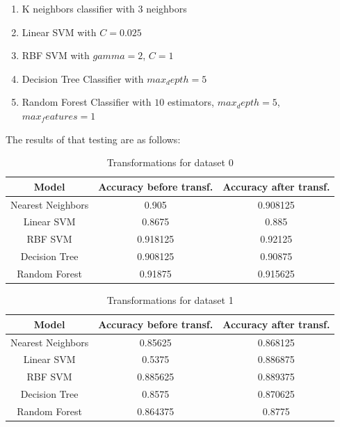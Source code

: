 \documentclass[conference]{IEEEtran}
\begin{document}
\begin{enumerate}
	\item K neighbors classifier with 3 neighbors
	\item Linear SVM with $C=0.025$
	\item RBF SVM with $gamma = 2$, $C = 1$
	\item Decision Tree Classifier with $max_depth = 5$
	\item Random Forest Classifier with $10$ estimators, $max_depth=5$, $max_features=1$
\end{enumerate}

The results of that testing are as follows:

\begin{table}[htbp]
	\caption{Transformations for dataset 0}
	\begin{center}
		\begin{tabular}{|c|c|c|}
			\hline
			\textbf{Model}&\textbf{Accuracy before transf.}&\textbf{Accuracy after transf.} \\
			\hline
			Nearest Neighbors&0.905&0.908125 \\
			\hline
			Linear SVM&0.8675&0.885 \\
			\hline
			RBF SVM&0.918125&0.92125 \\
			\hline
			Decision Tree&0.908125&0.90875 \\
			\hline
			Random Forest&0.91875&0.915625 \\
			\hline
		\end{tabular}
		\label{tab3}
	\end{center}
\end{table}

\begin{table}[htbp]
	\caption{Transformations for dataset 1}
	\begin{center}
		\begin{tabular}{|c|c|c|}
			\hline
			\textbf{Model}&\textbf{Accuracy before transf.}&\textbf{Accuracy after transf.} \\
			\hline
			Nearest Neighbors&0.85625&0.868125 \\
			\hline
			Linear SVM&0.5375&0.886875 \\
			\hline
			RBF SVM&0.885625&0.889375 \\
			\hline
			Decision Tree&0.8575&0.870625 \\
			\hline
			Random Forest&0.864375&0.8775 \\
			\hline
		\end{tabular}
		\label{tab4}
	\end{center}
\end{table}
\end{document}
